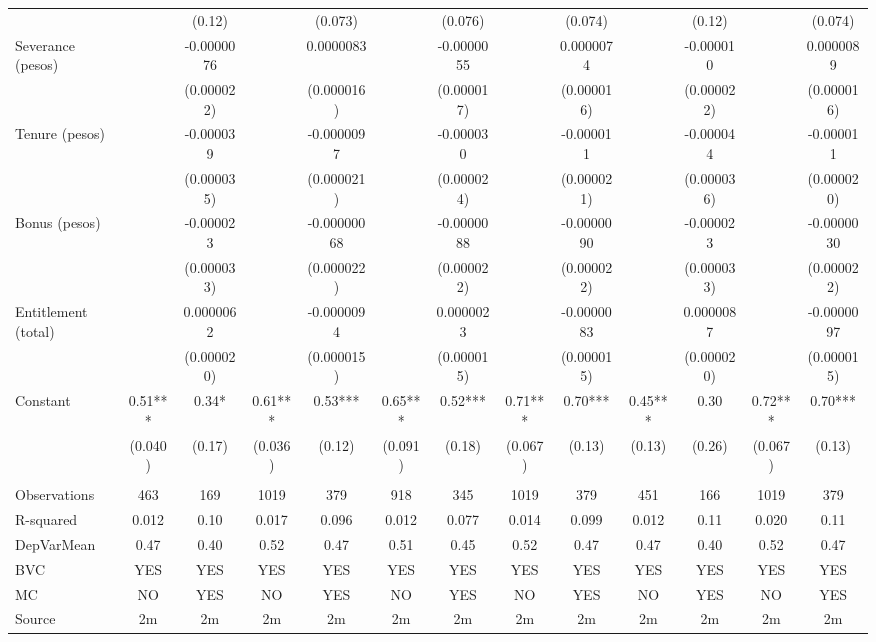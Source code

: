 \begin{tabular}{lcccccccccccc}
      &       & (0.12) &       & (0.073) &       & (0.076) &       & (0.074) &       & (0.12) &       & (0.074) \\
Severance (pesos) &       & -0.0000076 &       & 0.0000083 &       & -0.0000055 &       & 0.0000074 &       & -0.000010 &       & 0.0000089 \\
      &       & (0.000022) &       & (0.000016) &       & (0.000017) &       & (0.000016) &       & (0.000022) &       & (0.000016) \\
Tenure (pesos) &       & -0.000039 &       & -0.0000097 &       & -0.000030 &       & -0.000011 &       & -0.000044 &       & -0.000011 \\
      &       & (0.000035) &       & (0.000021) &       & (0.000024) &       & (0.000021) &       & (0.000036) &       & (0.000020) \\
Bonus (pesos) &       & -0.000023 &       & -0.00000068 &       & -0.0000088 &       & -0.0000090 &       & -0.000023 &       & -0.0000030 \\
      &       & (0.000033) &       & (0.000022) &       & (0.000022) &       & (0.000022) &       & (0.000033) &       & (0.000022) \\
Entitlement (total) &       & 0.0000062 &       & -0.0000094 &       & 0.0000023 &       & -0.0000083 &       & 0.0000087 &       & -0.0000097 \\
      &       & (0.000020) &       & (0.000015) &       & (0.000015) &       & (0.000015) &       & (0.000020) &       & (0.000015) \\
Constant & 0.51*** & 0.34* & 0.61*** & 0.53*** & 0.65*** & 0.52*** & 0.71*** & 0.70*** & 0.45*** & 0.30  & 0.72*** & 0.70*** \\
      & (0.040) & (0.17) & (0.036) & (0.12) & (0.091) & (0.18) & (0.067) & (0.13) & (0.13) & (0.26) & (0.067) & (0.13) \\
      &       &       &       &       &       &       &       &       &       &       &       &  \\
\midrule
Observations & 463   & 169   & 1019  & 379   & 918   & 345   & 1019  & 379   & 451   & 166   & 1019  & 379 \\
R-squared & 0.012 & 0.10  & 0.017 & 0.096 & 0.012 & 0.077 & 0.014 & 0.099 & 0.012 & 0.11  & 0.020 & 0.11 \\
DepVarMean & 0.47  & 0.40  & 0.52  & 0.47  & 0.51  & 0.45  & 0.52  & 0.47  & 0.47  & 0.40  & 0.52  & 0.47 \\
BVC   & YES   & YES   & YES   & YES   & YES   & YES   & YES   & YES   & YES   & YES   & YES   & YES \\
MC    & NO    & YES   & NO    & YES   & NO    & YES   & NO    & YES   & NO    & YES   & NO    & YES \\
Source & 2m    & 2m    & 2m    & 2m    & 2m    & 2m    & 2m    & 2m    & 2m    & 2m    & 2m    & 2m \\
\bottomrule
\bottomrule
\end{tabular}%
